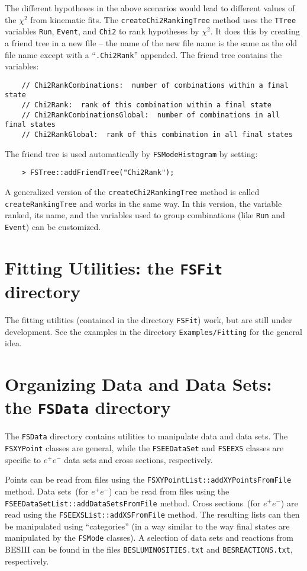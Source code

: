 \documentclass[11pt]{article}
\begin{document}
The different hypotheses in the above scenarios would lead to different values of the $\chi^2$ from kinematic fits.  The {\tt createChi2RankingTree} method uses the {\tt TTree} variables {\tt Run}, {\tt Event}, and {\tt Chi2} to rank hypotheses by $\chi^2$.  It does this by creating a friend tree in a new file -- the name of the new file name is the same as the old file name except with a ``{\tt .Chi2Rank}'' appended.  The friend tree contains the variables:
\begin{verbatim}
    // Chi2RankCombinations:  number of combinations within a final state
    // Chi2Rank:  rank of this combination within a final state
    // Chi2RankCombinationsGlobal:  number of combinations in all final states
    // Chi2RankGlobal:  rank of this combination in all final states
\end{verbatim}
The friend tree is used automatically by {\tt FSModeHistogram} by setting:
\begin{verbatim}
    > FSTree::addFriendTree("Chi2Rank");
\end{verbatim}
A generalized version of the {\tt createChi2RankingTree} method is called {\tt createRankingTree} and works in the same way.  In this version, the variable ranked, its name, and the variables used to group combinations (like {\tt Run} and {\tt Event}) can be customized.


\section{Fitting Utilities:  the {\tt FSFit} directory}

The fitting utilities (contained in the directory {\tt FSFit}) work, but are still under development.  See the examples in the directory {\tt Examples/Fitting} for the general idea.

\section{Organizing Data and Data Sets: the {\tt FSData} directory}

The {\tt FSData} directory contains utilities to manipulate data and data sets.  The {\tt FSXYPoint} classes are general, while the {\tt FSEEDataSet} and {\tt FSEEXS} classes are specific to $e^+e^-$ data sets and cross sections, respectively.

Points can be read from files using the {\tt FSXYPointList::addXYPointsFromFile} method.
Data sets~(for $e^+e^-$) can be read from files using the {\tt FSEEDataSetList::addDataSetsFromFile} method.  Cross sections~(for $e^+e^-$) are read using the {\tt FSEEXSList::addXSFromFile} method.  The resulting lists can then be manipulated using ``categories'' (in a way similar to the way final states are manipulated by the {\tt FSMode} classes).  A selection of data sets and reactions from BESIII can be found in the files {\tt BESLUMINOSITIES.txt} and {\tt BESREACTIONS.txt}, respectively.
\end{document}
